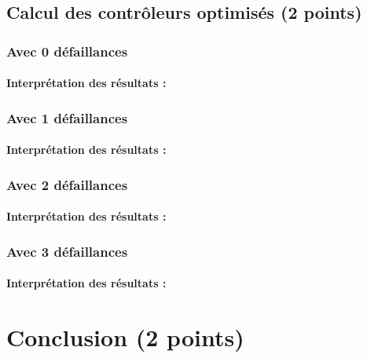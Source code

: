 \documentclass[a4paper]{book}
\begin{document}
\subsection{Calcul des contrôleurs optimisés (2 points)}
\subsubsection{Avec 0 défaillances}

\paragraph{Interprétation des résultats : }

\subsubsection{Avec 1 défaillances}

\paragraph{Interprétation des résultats : }

\subsubsection{Avec 2 défaillances}

\paragraph{Interprétation des résultats :}


\subsubsection{Avec 3 défaillances}

\paragraph{Interprétation des résultats :}

\section{Conclusion (2 points)}
\end{document}
